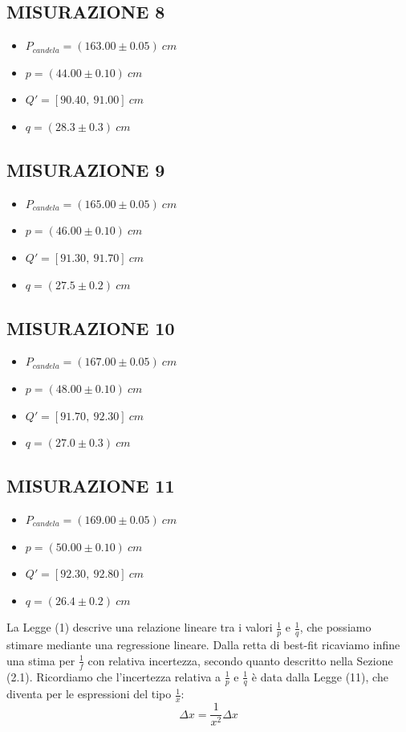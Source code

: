 \subsection{MISURAZIONE 8}
\begin{itemize}
	\item $P_{candela}=(163.00\pm 0.05)\ cm$
	\item $p = (44.00\pm 0.10)\ cm$
	\item $Q' = [90.40,\ 91.00]\ cm$
	\item $q = (28.3\pm 0.3)\ cm$
\end{itemize}

\subsection{MISURAZIONE 9}
\begin{itemize}
	\item $P_{candela}=(165.00\pm 0.05)\ cm$
	\item $p = (46.00\pm 0.10)\ cm$
	\item $Q' = [91.30,\ 91.70]\ cm$
	\item $q = (27.5\pm 0.2)\ cm$
\end{itemize}

\subsection{MISURAZIONE 10}
\begin{itemize}
	\item $P_{candela}=(167.00\pm 0.05)\ cm$
	\item $p = (48.00\pm 0.10)\ cm$
	\item $Q' = [91.70,\ 92.30]\ cm$
	\item $q = (27.0\pm 0.3)\ cm$
\end{itemize}

\subsection{MISURAZIONE 11}
\begin{itemize}
	\item $P_{candela}=(169.00\pm 0.05)\ cm$
	\item $p = (50.00\pm 0.10)\ cm$
	\item $Q' = [92.30,\ 92.80]\ cm$
	\item $q = (26.4\pm 0.2)\ cm$
\end{itemize}

La Legge (1) descrive una relazione lineare tra i valori $\frac{1}{p}$ e $\frac{1}{q}$, che possiamo stimare mediante una regressione lineare. Dalla retta di best-fit ricaviamo infine una stima per $\frac{1}{f}$ con relativa incertezza, secondo quanto descritto nella Sezione (2.1). Ricordiamo che l'incertezza relativa a $\frac{1}{p}$ e $\frac{1}{q}$ è data dalla Legge (11), che diventa per le espressioni del tipo $\frac{1}{x}$:
\begin{equation}
	\Delta x= \frac{1}{x^2}\Delta x
\end{equation}

